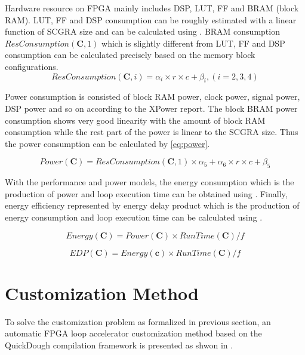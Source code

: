 Hardware resource on FPGA mainly includes DSP, LUT, FF and BRAM (block RAM). LUT, FF and DSP consumption can be roughly estimated with a linear function of SCGRA size and can be calculated using . BRAM consumption $ResConsumption(\bm{C}, 1)$ which is slightly different from LUT, FF and DSP consumption can be calculated precisely based on the memory block configurations. 
\begin{equation} \label{eq:dsplutff}
    ResConsumption(\bm{C}, i)=\alpha_i \times r \times c + \beta_i, (i=2,3,4)
\end{equation}

Power consumption is consisted of block RAM power, clock power, signal power, DSP power and so on according to the XPower report. The block BRAM power consumption shows very good linearity with the amount of block RAM consumption while the rest part of the power is linear to the SCGRA size. Thus the power consumption can be calculated by \eqref{eq:power}. 

\begin{equation}\label{eq:power}
Power(\bm{C}) = ResConsumption(\bm{C}, 1) \times \alpha_5 + \alpha_6 \times r \times c + \beta_5
\end{equation}

With the performance and power models, the energy consumption which is the production of power and loop execution time can be obtained using . Finally, energy efficiency represented by energy delay product which is the production of energy consumption and loop execution time can be calculated using .

\begin{equation} \label{eq:energy}
Energy(\bm{C}) = Power(\bm{C}) \times RunTime(\bm{C}) / f
\end{equation}

\begin{equation} \label{eq:edp}
EDP(\bm{C}) = Energy(\bm{c}) \times RunTime(\bm{C}) / f
\end{equation}

\section{Customization Method}
To solve the customization problem as formalized in previous section, an automatic FPGA loop accelerator customization method based on the QuickDough compilation framework is presented as shwon in . 

